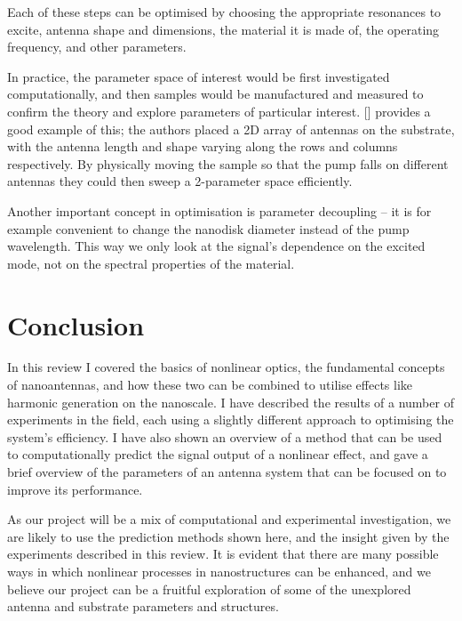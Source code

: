 \documentclass[12pt,a4paper]{article}
\newcommand{\citein}[1]{[\citen{#1}]}
\begin{document}
Each of these steps can be optimised by choosing the appropriate resonances to excite, antenna shape and dimensions, the material it is made of, the operating frequency, and other parameters.

In practice, the parameter space of interest would be first investigated computationally, and then samples would be manufactured and measured to confirm the theory and explore parameters of particular interest. \citein{obrienPredictingNonlinearProperties2015} provides a good example of this; the authors placed a 2D array of antennas on the substrate, with the antenna length and shape varying along the rows and columns respectively. By physically moving the sample so that the pump falls on different antennas they could then sweep a 2-parameter space efficiently.

Another important concept in optimisation is parameter decoupling -- it is for example convenient
to change the nanodisk diameter instead of the pump wavelength\cite{obrienPredictingNonlinearProperties2015, grinblatEnhancedThirdHarmonic2016}. This way we only look at the signal's dependence on the excited mode, not on the spectral properties of the material.

\section{Conclusion}
In this review I covered the basics of nonlinear optics, the fundamental concepts of nanoantennas, and how these two can be combined to utilise effects like harmonic generation on the nanoscale. I have described the results of a number of experiments in the field, each using a slightly different approach to optimising the system's efficiency. I have also shown an overview of a method that can be used to computationally predict the signal output of a nonlinear effect, and gave a brief overview of the parameters of an antenna system that can be focused on to improve its performance.

As our project will be a mix of computational and experimental investigation, we are likely to use the prediction methods shown here, and the insight given by the experiments described in this review. It is evident that there are many possible ways in which nonlinear processes in nanostructures can be enhanced, and we believe our project can be a fruitful exploration of some of the unexplored antenna and substrate parameters and structures.



\end{document}
